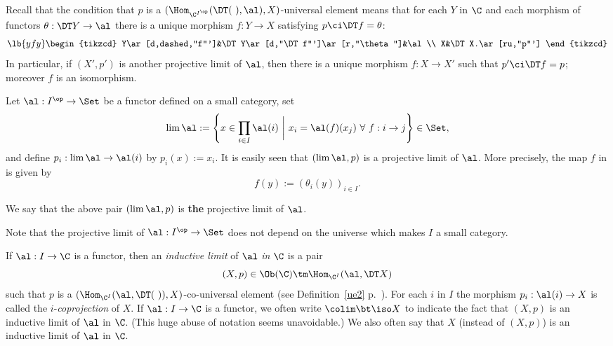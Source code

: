 \documentclass[12pt]{article}
\theoremstyle{remark}
\theoremstyle{definition}
\begin{document}
Recall that the condition that $p$ is a $(\Hom_{\C^{I^{\op}}}(\DT(\ ),\al),X)$\--universal element means that for each $Y$ in $\C$ and each morphism of functors $\theta:\DT Y\to\al$ there is a unique morphism $f:Y\to X$ satisfying $p\ci\DT f=\theta$: 
\begin{equation}\lb{yfy}
\begin{tikzcd}
Y\ar[d,dashed,"f"']&\DT Y\ar[d,"\DT f"']\ar[r,"\theta"]&\al\\ 
X&\DT X.\ar[ru,"p"']
\end{tikzcd}
\end{equation} 
In particular, if $(X',p')$ is another projective limit of $\al$, then there is a unique morphism $f:X\to X'$ such that $p'\ci\DT f=p$; moreover $f$ is an isomorphism.

Let $\al:I^{\op}\to\Set$ be a functor defined on a small category, set 
$$ 
\lim\al:=\left\{x\in\prod_{i\in I}\al(i)\ \bigg|\ x_i=\al(f)(x_j)\ \forall\ f:i\to j\right\}\in\Set,
$$ 
and define $p_i:\lim\al\to\al(i)$ by $p_i(x):=x_i$. It is easily seen that $(\lim\al,p)$ is a projective limit of $\al$. More precisely, the map $f$ in  is given by 
$$
f(y):=(\theta_i(y))_{i\in I}.
$$
\begin{conv}
We say that the above pair $(\lim\al,p)$ is \textbf{the} projective limit of $\al$.
\end{conv}

Note that the projective limit of $\al:I^{\op}\to\Set$ does not depend on the universe which makes $I$ a small category.

\begin{df}
If $\al:I\to\C$ is a functor, then an {\em inductive limit} of $\al$ {\em in} $\C$ is a pair 
$$
(X,p)\in\Ob(\C)\tm\Hom_{\C^I}(\al,\DT X)
$$
such that $p$ is a $(\Hom_{\C^I}(\al,\DT(\ )),X)$\--co-universal element (see Definition~\ref{ue2} p.~). For each $i$ in $I$ the morphism $p_i:\al(i)\to X$ is called the $i$-{\em coprojection} of $X$. If $\al:I\to\C$ is a functor, we often write $\colim\bt\iso X$ to indicate the fact that $(X,p)$ is an inductive limit of $\al$ in $\C$. (This huge abuse of notation seems unavoidable.) We also often say that $X$ (instead of $(X,p)$) is an inductive limit of $\al$ in $\C$. %
\end{df}
\end{document}
